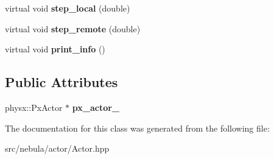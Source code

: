 \begin{DoxyCompactItemize}
\item 
\hypertarget{classneb_1_1Actor_1_1Actor_a2e8cfe97800ceea71ebd76a0a2170d29}{
virtual void {\bfseries step\_\-local} (double)}
\label{classneb_1_1Actor_1_1Actor_a2e8cfe97800ceea71ebd76a0a2170d29}

\item 
\hypertarget{classneb_1_1Actor_1_1Actor_a0b276371bc9b33cac32d7c15ab677c74}{
virtual void {\bfseries step\_\-remote} (double)}
\label{classneb_1_1Actor_1_1Actor_a0b276371bc9b33cac32d7c15ab677c74}

\item 
\hypertarget{classneb_1_1Actor_1_1Actor_a96d7b1463accb3f917047082fa0e7e38}{
virtual void {\bfseries print\_\-info} ()}
\label{classneb_1_1Actor_1_1Actor_a96d7b1463accb3f917047082fa0e7e38}

\end{DoxyCompactItemize}
\subsection*{Public Attributes}
\begin{DoxyCompactItemize}
\item 
\hypertarget{classneb_1_1Actor_1_1Actor_a4b5d6b98af98afece2a7f09c1ba7e69c}{
physx::PxActor $\ast$ {\bfseries px\_\-actor\_\-}}
\label{classneb_1_1Actor_1_1Actor_a4b5d6b98af98afece2a7f09c1ba7e69c}

\end{DoxyCompactItemize}


The documentation for this class was generated from the following file:\begin{DoxyCompactItemize}
\item 
src/nebula/actor/Actor.hpp\end{DoxyCompactItemize}
